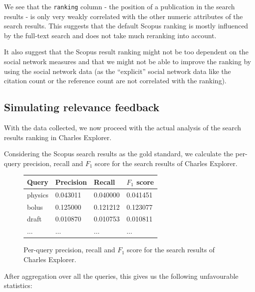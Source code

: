 We see that the \texttt{ranking} column - the position of a publication in the search results - is only very weakly correlated with the other numeric attributes of the search results.
This suggests that the default Scopus ranking is mostly influenced by the full-text search and does not take much reranking into account.

It also suggest that the Scopus result ranking might not be too dependent on the social network measures and that we might not be able to improve the ranking 
by using the social network data (as the ``explicit'' social network data like the citation count or the reference count are not correlated with the ranking).

\subsection{Simulating relevance feedback}

With the data collected, we now proceed with the actual analysis of the search results ranking in Charles Explorer.

Considering the Scopus search results as the gold standard, we calculate the per-query precision, recall and $F_1$ score for the search results of Charles Explorer.

\begin{figure}[!ht]
    \captionsetup{width=.9\linewidth}
    \centering
    \begin{tabular}{|l|l|l|l|}
    \hline
        \textbf{Query} & \textbf{Precision} & \textbf{Recall} & \textbf{$F_1$ score} \\ \hline
        physics & 0.043011 & 0.040000 & 0.041451 \\ \hline
        bolus & 0.125000 & 0.121212 & 0.123077 \\ \hline
        draft & 0.010870 & 0.010753 & 0.010811 \\ \hline
        $\hdots$ & $\hdots$ & $\hdots$ & $\hdots$ \\ \hline
    \end{tabular}
    \caption{Per-query precision, recall and $F_1$ score for the search results of Charles Explorer.}
\end{figure}

After aggregation over all the queries, this gives us the following unfavourable statistics:

